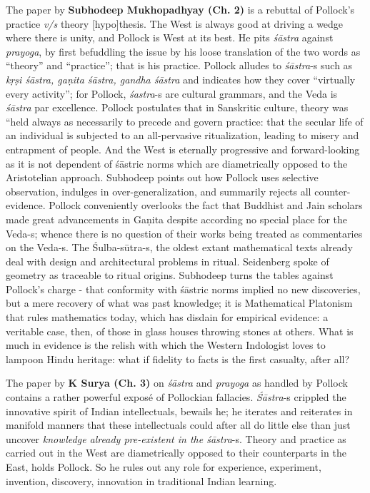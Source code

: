 The paper by {\bf Subhodeep Mukhopadhyay (Ch. 2)} is a rebuttal of Pollock’s practice {\sl v/s} theory [hypo]thesis. The West is always good at driving a wedge where there is unity, and Pollock is West at its best. He pits {\sl śāstra} against {\sl prayoga}, by first befuddling the issue by his loose translation of the two words as “theory” and “practice”; that is his practice. Pollock alludes to {\sl śāstra}-s such as {\sl kṛṣi śāstra, gaṇita śāstra, gandha śāstra} and indicates how they cover “virtually every activity”; for Pollock, {\sl śastra}-s are cultural grammars, and the Veda is {\sl śāstra} par excellence. Pollock postulates that in Sanskritic culture, theory was “held always as necessarily to precede and govern practice: that the secular life of an individual is subjected to an all-pervasive ritualization, leading to misery and entrapment of people. And the West is eternally progressive and forward-looking as it is not dependent of śāstric norms which are diametrically opposed to the Aristotelian approach. Subhodeep points out how Pollock uses selective observation, indulges in over-generalization, and summarily rejects all counter-evidence. Pollock conveniently overlooks the fact that Buddhist and Jain scholars made great advancements in Gaṇita despite according no special place for the Veda-s; whence there is no question of their works being treated as commentaries on the Veda-s. The Śulba-sūtra-s, the oldest extant mathematical texts already deal with design and architectural problems in ritual. Seidenberg spoke of geometry as traceable to ritual origins. Subhodeep turns the tables against Pollock’s charge - that conformity with śāstric norms implied no new discoveries, but a mere recovery of what was past knowledge; it is Mathematical Platonism that rules mathematics today, which has disdain for empirical evidence: a veritable case, then, of those in glass houses throwing stones at others. What is much in evidence is the relish with which the Western Indologist loves to lampoon Hindu heritage: what if fidelity to facts is the first casualty, after all?

The paper by {\bf K Surya (Ch. 3)} on {\sl śāstra} and {\sl prayoga} as handled by Pollock contains a rather powerful exposé of Pollockian fallacies. {\sl Śāstra}-s crippled the innovative spirit of Indian intellectuals, bewails he; he iterates and reiterates in manifold manners that these intellectuals could after all do little else than just uncover {\sl knowledge already pre-existent in the śāstra}-s. Theory and practice as carried out in the West are diametrically opposed to their counterparts in the East, holds Pollock. So he rules out any role for experience, experiment, invention, discovery, innovation in traditional Indian learning.

